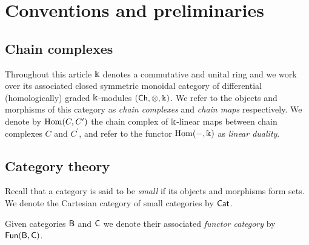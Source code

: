 
\section{Conventions and preliminaries} \label{s:preliminaries}

\subsection{Chain complexes }

Throughout this article $\Bbbk$ denotes a commutative and unital ring and we work over its associated closed symmetric monoidal category of differential (homologically) graded $\Bbbk$-modules $(\mathsf{Ch}, \otimes, \Bbbk)$.
We refer to the objects and morphisms of this category as \textit{chain complexes} and \textit{chain maps} respectively. We denote by $\mathrm{Hom}(C, C^\prime)$ the chain complex of $\Bbbk$-linear maps between chain complexes $C$ and $C^\prime$, and refer to the functor $\mathrm{Hom}(-, \Bbbk)$ as \textit{linear duality}.


\subsection{Category theory}

%

Recall that a category is said to be \textit{small} if its objects and morphisms form sets.
We denote the Cartesian category of small categories by $\mathsf{Cat}$.

Given categories $\mathsf{B}$ and $\mathsf{C}$ we denote their associated \textit{functor category} by $\mathsf{Fun}(\mathsf{B}, \mathsf{C})$.

